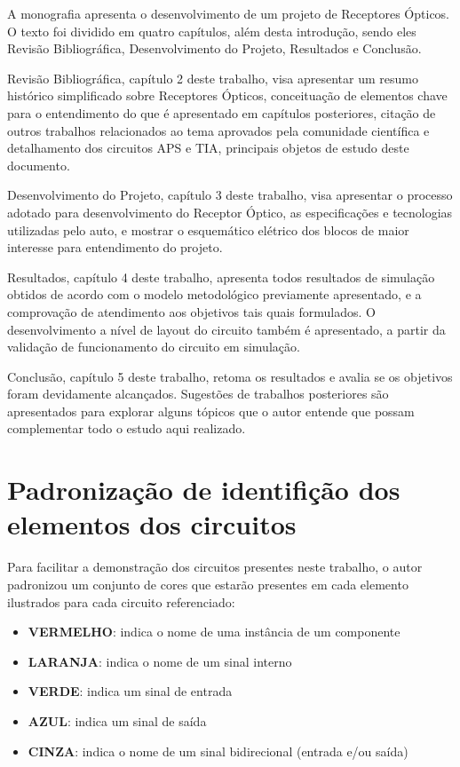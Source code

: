 A monografia apresenta o desenvolvimento de um projeto de Receptores Ópticos. O texto foi dividido em quatro capítulos, além desta introdução, sendo eles Revisão Bibliográfica, Desenvolvimento do Projeto, Resultados e Conclusão.

Revisão Bibliográfica, capítulo 2 deste trabalho, visa apresentar um resumo histórico simplificado sobre Receptores Ópticos, conceituação de elementos chave para o entendimento do que é apresentado em capítulos posteriores, citação de outros trabalhos relacionados ao tema aprovados pela comunidade científica e detalhamento dos circuitos APS e TIA, principais objetos de estudo deste documento.

Desenvolvimento do Projeto, capítulo 3 deste trabalho, visa apresentar o processo adotado para desenvolvimento do Receptor Óptico, as especificações e tecnologias utilizadas pelo auto, e mostrar o esquemático elétrico dos blocos de maior interesse para entendimento do projeto.

Resultados, capítulo 4 deste trabalho, apresenta todos resultados de simulação obtidos de acordo com o modelo metodológico previamente apresentado, e a comprovação de atendimento aos objetivos tais quais formulados. O desenvolvimento a nível de layout do circuito também é apresentado, a partir da validação de funcionamento do circuito em simulação.

Conclusão, capítulo 5 deste trabalho, retoma os resultados e avalia se os objetivos foram devidamente alcançados. Sugestões de trabalhos posteriores são apresentados para explorar alguns tópicos que o autor entende que possam complementar todo o estudo aqui realizado.

\section{Padronização de identifição dos elementos dos circuitos}
\label{section:padrao_sinais}

Para facilitar a demonstração dos circuitos presentes neste trabalho, o autor padronizou um conjunto de cores que estarão presentes em cada elemento ilustrados para cada circuito referenciado:

\begin{itemize}
    \item \textbf{\color{red}VERMELHO}: indica o nome de uma inst\^ancia de um componente
    \item \textbf{\color{orange}LARANJA}: indica o nome de um sinal interno
    \item \textbf{\color{green}VERDE}: indica um sinal de entrada
    \item \textbf{\color{blue}AZUL}: indica um sinal de sa\'ida
    \item \textbf{\color{gray}CINZA}: indica o nome de um sinal bidirecional (entrada e/ou sa\'ida)
\end{itemize}